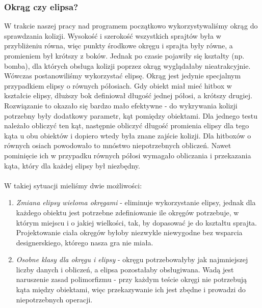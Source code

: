 	\subsubsection{Okrąg czy elipsa?}
		\indent \indent W trakcie naszej pracy nad programem początkowo wykorzystywaliśmy okrąg do sprawdzania kolizji. Wysokość i szerokość wszystkich sprajtów była w przybliżeniu równa, więc punkty środkowe okręgu i sprajta były równe, a promieniem był krótszy z boków. Jednak po czasie pojawiły się kształty (np. bomba), dla których obsługa kolizji poprzez okrąg wyglądałaby nieatrakcyjnie. Wówczas postanowiliśmy wykorzystać elipsę. Okrąg jest jedynie specjalnym przypadkiem elipsy o równych półosiach. Gdy obiekt miał mieć hitbox w kształcie elipsy, dłuższy bok definiował długość jednej półosi, a krótszy drugiej.
		\newpage
		\indent Rozwiązanie to okazało się bardzo mało efektywne - do wykrywania kolizji potrzebny były dodatkowy parametr, kąt pomiędzy obiektami. Dla jednego testu należało obliczyć ten kąt, następnie obliczyć długość promienia elipsy dla tego kąta u obu obiektów i dopiero wtedy była znane zajście kolizji. Dla hitboxów o równych osiach powodowało to mnóstwo niepotrzebnych obliczeń. Nawet pominięcie ich w przypadku równych półosi wymagało obliczania i przekazania kąta, który dla każdej elipsy był niezbędny.\\\\
		W takiej sytuacji mieliśmy dwie możliwości:
		\begin{enumerate}
			\item \textit{Zmiana elipsy wieloma okręgami} - eliminuje wykorzystanie elipsy, jednak dla każdego obiektu jest potrzebne zdefiniowanie ile okręgów potrzebuje, w którym miejscu i o jakiej wielkości, tak, by dopasować je do kształtu sprajta. Projektowanie ciała okręgów byłoby niezwykle niewygodne bez wsparcia designerskiego, którego nasza gra nie miała. 
			\item \textit{Osobne klasy dla okręgu i elipsy} - okręgu potrzebowałyby jak najmniejszej liczby danych i obliczeń, a elipsa pozostałaby obsługiwana. Wadą jest naruszenie zasad polimorfizmu - przy każdym teście okręgi nie potrzebują kąta między obiektami, więc przekazywanie ich jest zbędne i prowadzi do niepotrzebnych operacji.
		\end{enumerate}
